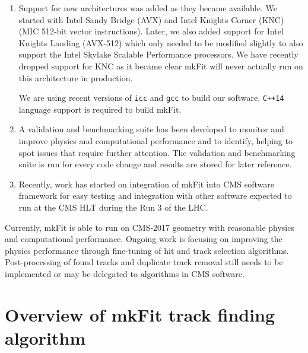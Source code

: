 \documentclass{webofc}
\def\mkfit{mkFit\xspace}
\def\stt#1{{\small\texttt{#1}}}
\begin{document}
\begin{enumerate}
\item Support for new architectures was added as they became
  available. We started with Intel Sandy Bridge (AVX) and Intel Knights
  Corner (KNC) (MIC 512-bit vector instructions). Later, we also added support for
  Intel Knights Landing (AVX-512) which only needed to be modified slightly
  to also support the Intel Skylake Scalable Performance processors. We have recently dropped
  support for KNC as it became clear \mkfit will never actually run
  on this architecture in production.

  We are using recent versions of \stt{icc} and \stt{gcc} to build our
  software. \stt{C++14} language support is required to build \mkfit.

\item A validation and benchmarking suite has been developed to monitor and
  improve physics and computational performance and to identify, helping to spot
  issues that require further attention. The validation and benchmarking suite
  is run for every code change and results are stored for later reference.

\item Recently, work has started on integration of \mkfit into CMS software
  framework for easy testing and integration with other software expected to
  run at the CMS HLT during the Run 3 of the LHC.

\end{enumerate}

Currently, \mkfit is able to run on CMS-2017 geometry with reasonable physics
and computational performance. Ongoing work is focusing on improving the
physics performance through fine-tuning of hit and track selection
algorithms. Post-processing of found tracks and duplicate track removal
still needs to be implemented or may be delegated to algorithms in CMS
software.


\newpage

\section{Overview of \mkfit track finding algorithm}
\label{sec:track-finding-overview}
\end{document}
